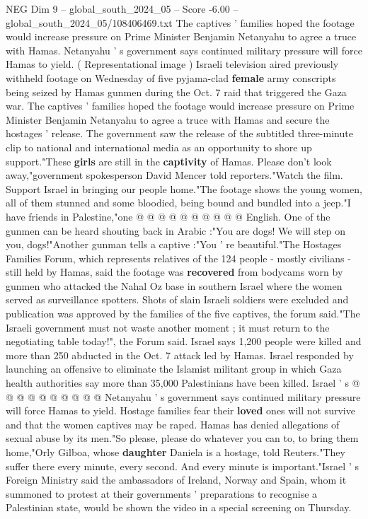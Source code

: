 \begin{textsample}{NEG Dim 9 – global\_south\_2024\_05 – Score -6.00 – global\_south\_2024\_05/108406469.txt}  \label{ex:f9_neg_401}
The captives ' families hoped the footage would increase pressure on Prime Minister Benjamin Netanyahu to agree a truce with Hamas.
Netanyahu ' s government says continued military pressure will force Hamas to yield. ( Representational image ) Israeli television aired previously withheld footage on Wednesday of five pyjama-clad \textbf{female} army conscripts being seized by Hamas gunmen during the Oct. 7 raid that triggered the Gaza war.
The captives ' families hoped the footage would increase pressure on Prime Minister Benjamin Netanyahu to agree a truce with Hamas and secure the hostages ' release.
The government saw the release of the subtitled three-minute clip to national and international media as an opportunity to shore up support."These \textbf{girls} are still in the \textbf{captivity} of Hamas.
Please don't look away,"government spokesperson David Mencer told reporters."Watch the film.
Support Israel in bringing our people home."The footage shows the young women, all of them stunned and some bloodied, being bound and bundled into a jeep."I have friends in Palestine,"one @ @ @ @ @ @ @ @ @ @ English.
One of the gunmen can be heard shouting back in Arabic :"You are dogs!
We will step on you, dogs!"Another gunman tells a captive :"You ' re beautiful."The Hostages Families Forum, which represents relatives of the 124 people - mostly civilians - still held by Hamas, said the footage was \textbf{recovered} from bodycams worn by gunmen who attacked the Nahal Oz base in southern Israel where the women served as surveillance spotters.
Shots of slain Israeli soldiers were excluded and publication was approved by the families of the five captives, the forum said."The Israeli government must not waste another moment ; it must return to the negotiating table today!", the Forum said.
Israel says 1,200 people were killed and more than 250 abducted in the Oct. 7 attack led by Hamas.
Israel responded by launching an offensive to eliminate the Islamist militant group in which Gaza health authorities say more than 35,000 Palestinians have been killed.
Israel ' s @ @ @ @ @ @ @ @ @ @ Netanyahu ' s government says continued military pressure will force Hamas to yield.
Hostage families fear their \textbf{loved} ones will not survive and that the women captives may be raped.
Hamas has denied allegations of sexual abuse by its men."So please, please do whatever you can to, to bring them home,"Orly Gilboa, whose \textbf{daughter} Daniela is a hostage, told Reuters."They suffer there every minute, every second.
And every minute is important."Israel ' s Foreign Ministry said the ambassadors of Ireland, Norway and Spain, whom it summoned to protest at their governments ' preparations to recognise a Palestinian state, would be shown the video in a special screening on Thursday.

\end{textsample}
